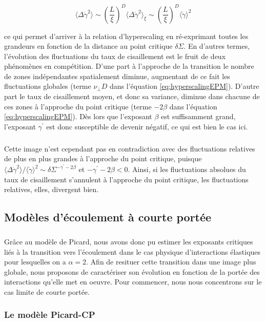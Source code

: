 \begin{equation}
	\langle \Delta\dot{\gamma}^2 \rangle \sim \left(\frac{L}{\xi}\right)^D\langle \Delta\dot{\gamma}^2 \rangle_\xi \sim \left(\frac{L}{\xi}\right)^D\langle \dot{\gamma} \rangle^2
\end{equation}

\noindent ce qui permet d'arriver à la relation d'hyperscaling en ré-exprimant toutes les grandeurs en fonction de la distance au point critique $\delta\Sigma$. En d'autres termes, l'évolution des fluctuations du taux de cisaillement est le fruit de deux phénomènes en compétition. D'une part à l'approche de la transition le nombre de zones indépendantes spatialement diminue, augmentant de ce fait les fluctuations globales (terme $\nu_\perp D$ dans l'équation \autoref{eq:hyperscalingEPM}). D'autre part le taux de cisaillement moyen, et donc sa variance, diminue dans chacune de ces zones à l'approche du point critique (terme $-2\beta$ dans l'équation \autoref{eq:hyperscalingEPM}). Dès lors que l'exposant $\beta$ est suffisamment grand, l'exposant $\gamma^\prime$ est donc susceptible de devenir négatif, ce qui est bien le cas ici.

\subparagraph{}Cette image n'est cependant pas en contradiction avec des fluctuations relatives de plus en plus grandes à l'approche du point critique, puisque $\langle \Delta\dot{\gamma}^2 \rangle/\langle \dot{\gamma}\rangle^2 \sim \delta\Sigma^{-\gamma^\prime - 2\beta}$ et $-\gamma^\prime - 2\beta < 0$. Ainsi, si les fluctuations absolues du taux de cisaillement s'annulent à l'approche du point critique, les fluctuations relatives, elles, divergent bien.

\subsection{Modèles d'écoulement à courte portée}

\subparagraph{}Grâce au modèle de Picard, nous avons donc pu estimer les exposants critiques liés à la transition vers l'écoulement dans le cas physique d'interactions élastiques pour lesquelles on a $\alpha = 2$. Afin de resituer cette transition dans une image plus globale, nous proposons de caractériser son évolution en fonction de la portée des interactions qu'elle met en oeuvre. Pour commencer, nous nous concentrons sur le cas limite de courte portée.

\subsubsection{Le modèle Picard-CP}

